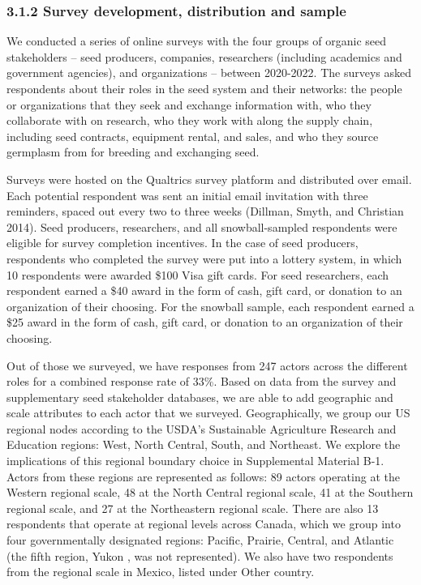 \documentclass[twoside,12pt,final]{ucthesis-CA2012}
\begin{document}
\begin{ucmainmatter}
\hypertarget{survey-development-distribution-and-sample}{%
\subsubsection{3.1.2 Survey development, distribution and sample}\label{survey-development-distribution-and-sample}}

We conducted a series of online surveys with the four groups of organic
seed stakeholders -- seed producers, companies, researchers (including
academics and government agencies), and organizations -- between
2020-2022. The surveys asked respondents about their roles in the seed
system and their networks: the people or organizations that they seek
and exchange information with, who they collaborate with on research,
who they work with along the supply chain, including seed contracts,
equipment rental, and sales, and who they source germplasm from for
breeding and exchanging seed.

Surveys were hosted on the Qualtrics survey platform and distributed
over email. Each potential respondent was sent an initial email
invitation with three reminders, spaced out every two to three weeks
(Dillman, Smyth, and Christian
2014). Seed producers,
researchers, and all snowball-sampled respondents were eligible for
survey completion incentives. In the case of seed producers, respondents
who completed the survey were put into a lottery system, in which 10
respondents were awarded \$100 Visa gift cards. For seed researchers,
each respondent earned a \$40 award in the form of cash, gift card, or
donation to an organization of their choosing. For the snowball sample,
each respondent earned a \$25 award in the form of cash, gift card, or
donation to an organization of their choosing.

Out of those we surveyed, we have responses from 247 actors across the
different roles for a combined response rate of 33\%. Based on data from
the survey and supplementary seed stakeholder databases, we are able to
add geographic and scale attributes to each actor that we surveyed.
Geographically, we group our US regional nodes according to the USDA's
Sustainable Agriculture Research and Education regions: West, North
Central, South, and Northeast. We explore the implications of this
regional boundary choice in Supplemental Material B-1. Actors from these
regions are represented as follows: 89 actors operating at the Western
regional scale, 48 at the North Central regional scale, 41 at the
Southern regional scale, and 27 at the Northeastern regional scale.
There are also 13 respondents that operate at regional levels across
Canada, which we group into four governmentally designated regions:
Pacific, Prairie, Central, and Atlantic (the fifth region, Yukon , was
not represented). We also have two respondents from the regional scale
in Mexico, listed under \textquotesingle Other country\textquotesingle.


\end{ucmainmatter}
\end{document}
